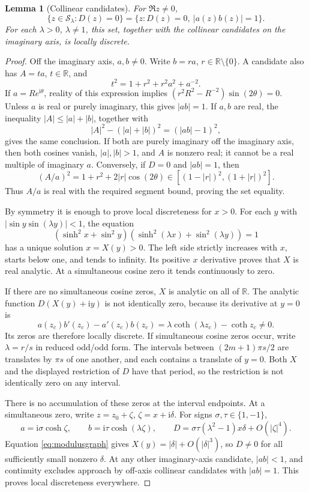 \documentclass[11pt]{article}
\numberwithin{equation}{section}
\newtheorem{lemma}[theorem]{Lemma}
\theoremstyle{definition}
\newcommand{\R}{\mathbb R}
\newcommand{\ii}{\mathrm i}
\newcommand{\cS}{\mathcal S}
\begin{document}
\begin{lemma}[Collinear candidates]\label{lem:collinear}
For \(\Re z\ne0\),
\[
 \{z\in\cS_\lambda:D(z)=0\}
 =\{z:D(z)=0,\ |a(z)b(z)|=1\}.
\]
For each \(\lambda>0\), \(\lambda\ne1\), this set, together with
the collinear candidates on the imaginary axis, is locally discrete.
\end{lemma}
\begin{proof}
Off the imaginary axis, \(a,b\ne0\). Write \(b=r a\), \(r\in\R\setminus
\{0\}\). A candidate also has \(A=t a\), \(t\in\R\), and
\[
 t^2=1+r^2+r^2a^2+a^{-2}.
\]
If \(a=R e^{\ii\theta}\), reality of this expression implies
\((r^2R^2-R^{-2})\sin(2\theta)=0\). Unless \(a\) is real or purely
imaginary, this gives \(|ab|=1\). If \(a,b\) are real, the inequality
\(|A|\le|a|+|b|\), together with
\[
 |A|^2-(|a|+|b|)^2=(|ab|-1)^2,
\]
gives the same conclusion. If both are purely imaginary off the
imaginary axis, then both cosines vanish, \(|a|,|b|>1\), and \(A\)
is nonzero real; it cannot be a real multiple of imaginary \(a\).
Conversely, if \(D=0\) and \(|ab|=1\), then
\[
 (A/a)^2=1+r^2+2|r|\cos(2\theta)
                   \in[(1-|r|)^2,(1+|r|)^2].
\]
Thus \(A/a\) is real with the required segment bound, proving the
set equality.

By symmetry it is enough to prove local discreteness for \(x>0\).
For each \(y\) with \(|\sin y\sin(\lambda y)|<1\), the equation
\begin{equation}\label{eq:modulusgraph}
 (\sinh^2x+\sin^2y)(\sinh^2(\lambda x)+\sin^2(\lambda y))=1
\end{equation}
has a unique solution \(x=X(y)>0\). The left side strictly increases
with \(x\), starts below one, and tends to infinity. Its positive
\(x\) derivative proves that \(X\) is real analytic. At a simultaneous
cosine zero it tends continuously to zero.

If there are no simultaneous cosine zeros, \(X\) is analytic on all
of \(\R\). The analytic function \(D(X(y)+\ii y)\) is not identically
zero, because its derivative at \(y=0\) is
\[
 a(z_c)b'(z_c)-a'(z_c)b(z_c)
       =\lambda\coth(\lambda z_c)-\coth z_c\ne0.
\]
Its zeros are therefore locally discrete. If simultaneous cosine
zeros occur, write \(\lambda=r/s\) in reduced odd/odd form. The
intervals between \((2m+1)\pi s/2\) are translates by \(\pi s\) of
one another, and each contains a translate of \(y=0\). Both \(X\)
and the displayed restriction of \(D\) have that period, so the
restriction is not identically zero on any interval.

There is no accumulation of these zeros at the interval endpoints.
At a simultaneous zero, write \(z=z_0+\zeta\), \(\zeta=x+\ii\delta\).
For signs \(\sigma,\tau\in\{1,-1\}\),
\[
 a=\ii\sigma\cosh\zeta,\qquad
 b=\ii\tau\cosh(\lambda\zeta),\qquad
 D=\sigma\tau(\lambda^2-1)x\delta+O(|\zeta|^4).
\]
Equation \eqref{eq:modulusgraph} gives
\(X(y)=|\delta|+O(|\delta|^3)\), so \(D\ne0\) for all sufficiently
small nonzero \(\delta\). At any other imaginary-axis candidate,
\(|ab|<1\), and continuity excludes approach by off-axis collinear
candidates with \(|ab|=1\). This proves local discreteness everywhere.
\end{proof}
\end{document}

